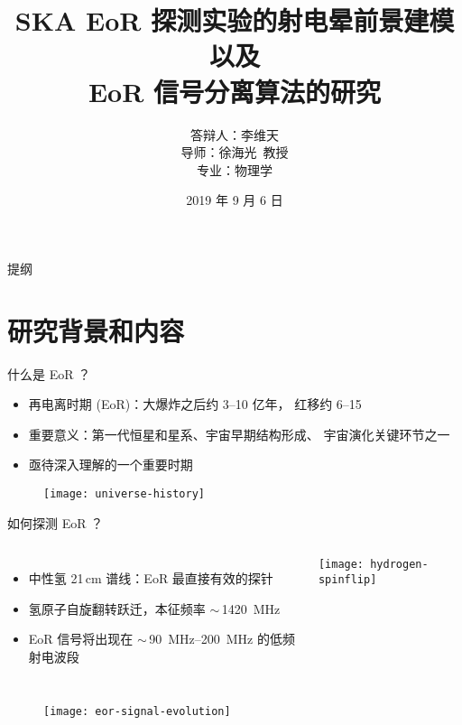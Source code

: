 \documentclass{beamer}
\title{%
  SKA EoR 探测实验的射电晕前景建模以及\texorpdfstring{\\}{ }%
  EoR 信号分离算法的研究%
}
\author{%
  答辩人：李维天\texorpdfstring{\\}{ / }
  导师：徐海光~教授\texorpdfstring{\\}{ / }
  专业：物理学
}
\institute{%
  物理与天文学院\\%
  上海交通大学%
}
\date{\small 2019 年 9 月 6 日}
\begin{document}
\maketitle

\begin{frame}{提\cspace{}纲}
  \tableofcontents[hideallsubsections]
\end{frame}


\section{研究背景和内容}

\begin{frame}{什么是 EoR ？}
  \begin{itemize}
    \item \alert{再电离时期 (EoR)}：大爆炸之后约 \numrange{3}{10} 亿年，
      红移约 \numrange{6}{15}
    \item \alert{重要意义}：第一代恒星和星系、宇宙早期结构形成、
      宇宙演化关键环节之一
    \item 亟待深入理解的一个重要时期
  \end{itemize}

  \vspace{-1ex}
  \begin{figure}
    \centering
    \texttt{[image: universe-history]}
  \end{figure}

\end{frame}

\begin{frame}{如何探测 EoR ？}
  \begin{columns}
    \begin{itemize}
      \item \alert{中性氢 21\,cm 谱线}：EoR 最直接有效的探针
      \item 氢原子自旋翻转跃迁，本征频率 $\sim$\,\SI{1420}{\MHz}
      \item EoR 信号将出现在 $\sim$\,\SIrange{90}{200}{\MHz}
        的\alert{低频射电波段}
    \end{itemize}

    \texttt{[image: hydrogen-spinflip]}
  \end{columns}

  \vspace{-1ex}
  \begin{figure}
    \centering
    \texttt{[image: eor-signal-evolution]}
  \end{figure}

\end{frame}
\end{document}
